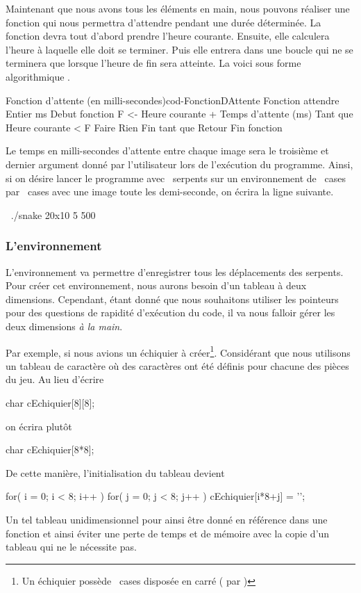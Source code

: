 \documentclass[a4paper]{article}
\begin{document}
					Maintenant que nous avons tous les éléments en main, nous pouvons réaliser une fonction qui nous permettra d'attendre pendant une durée déterminée.
					La fonction devra tout d'abord prendre l'heure courante.
					Ensuite, elle calculera l'heure à laquelle elle doit se terminer.
					Puis elle entrera dans une boucle qui ne se terminera que lorsque l'heure de fin sera atteinte.
					La voici sous forme algorithmique .
					\begin{Code}[language=algo]{Fonction d'attente (en milli-secondes)}{cod-FonctionDAttente}
Fonction attendre
	Entier ms
Debut fonction
	F <- Heure courante + Temps d'attente (ms)
	Tant que Heure courante < F Faire
		Rien
	Fin tant que
	Retour
Fin fonction
					\end{Code}

					Le temps en milli-secondes d'attente entre chaque image sera le troisième et dernier argument donné par l'utilisateur lors de l'exécution du programme.
					Ainsi, si on désire lancer le programme avec ~serpents sur un environnement de ~cases par ~cases avec une image toute les demi-seconde, on écrira la ligne suivante.
					\begin{Code*}
$~$ ./snake 20x10 5 500
					\end{Code*}

			\subsubsection{L'environnement}
				L'environnement va permettre d'enregistrer tous les déplacements des serpents.
				Pour créer cet environnement, nous aurons besoin d'un tableau à deux dimensions.
				Cependant, étant donné que nous souhaitons utiliser les pointeurs pour des questions de rapidité d'exécution du code, il va nous falloir gérer les deux dimensions \emph{à la main}.

				Par exemple, si nous avions un échiquier à créer\footnote{Un échiquier possède ~cases disposée en carré (\nombre{8} par )}.
				Considérant que nous utilisons un tableau de caractère où des caractères ont été définis pour chacune des pièces du jeu.
				Au lieu d'écrire
				\begin{Code*}
char cEchiquier[8][8];
				\end{Code*}
				on écrira plutôt
				\begin{Code*}
char cEchiquier[8*8];
				\end{Code*}
				De cette manière, l'initialisation du tableau devient
				\begin{Code*}
for( i = 0; i < 8; i++ )
{
	for( j = 0; j < 8; j++ )
	{
		cEchiquier[i*8+j] = '\0';
	}
}
				\end{Code*}
				Un tel tableau unidimensionnel pour ainsi être donné en référence dans une fonction et ainsi éviter une perte de temps et de mémoire avec la copie d'un tableau qui ne le nécessite pas.
\end{document}
